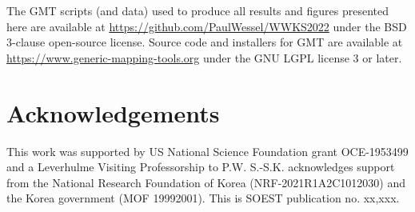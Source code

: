 The GMT scripts (and data) used to produce all results and figures presented here
are available at \url{https://github.com/PaulWessel/WWKS2022}
under the BSD 3-clause open-source license.
Source code and installers for GMT are available at
\url{https://www.generic-mapping-tools.org} under the GNU LGPL license 3 or later.


\section{Acknowledgements}
This work was supported by US National Science Foundation grant OCE-1953499
and a Leverhulme Visiting Professorship to P.W.
S.-S.K. acknowledges support from the National Research Foundation of Korea
(NRF-2021R1A2C1012030) and the Korea government (MOF 19992001).
This is SOEST publication no. xx,xxx.
